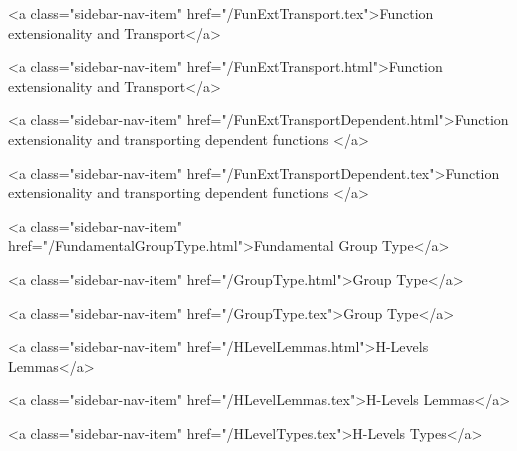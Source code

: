       
    
      
        
          <a class="sidebar-nav-item" href="/FunExtTransport.tex">Function extensionality and Transport</a>
        
      
    
      
        
          <a class="sidebar-nav-item" href="/FunExtTransport.html">Function extensionality and Transport</a>
        
      
    
      
        
          <a class="sidebar-nav-item" href="/FunExtTransportDependent.html">Function extensionality and transporting dependent functions </a>
        
      
    
      
        
          <a class="sidebar-nav-item" href="/FunExtTransportDependent.tex">Function extensionality and transporting dependent functions </a>
        
      
    
      
        
          <a class="sidebar-nav-item" href="/FundamentalGroupType.html">Fundamental Group Type</a>
        
      
    
      
        
          <a class="sidebar-nav-item" href="/GroupType.html">Group Type</a>
        
      
    
      
        
          <a class="sidebar-nav-item" href="/GroupType.tex">Group Type</a>
        
      
    
      
        
          <a class="sidebar-nav-item" href="/HLevelLemmas.html">H-Levels Lemmas</a>
        
      
    
      
        
          <a class="sidebar-nav-item" href="/HLevelLemmas.tex">H-Levels Lemmas</a>
        
      
    
      
        
          <a class="sidebar-nav-item" href="/HLevelTypes.tex">H-Levels Types</a>
        
      
    
